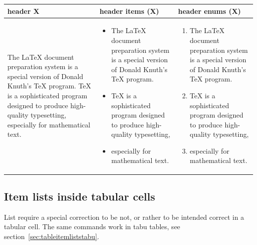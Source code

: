 \begin{filecontents*}{\democodefile}
\begin{center}
\small\centering\renewcommand{\arraystretch}{1.4}  
\begin{tabularx}{1\textwidth}{|X|X|X|}
\hline
   \centering header X &
   \centering header items (X) &   
   \centering header enums (X) \tabularnewline
\hline
%
The \LaTeX{} document preparation system is a special version of Donald
Knuth's \TeX{} program. \TeX{} is a sophisticated program designed to 
produce high-quality typesetting, especially for mathematical text.
&
\tableitemize
\begin{itemize}
\item The \LaTeX{} document preparation system is a special version of Donald
Knuth's \TeX{} program.
\item \TeX{} is a sophisticated program designed to produce high-quality typesetting,
\item especially for mathematical text.
\end{itemize}
&
\tableitemize
\begin{enumerate}
\item The \LaTeX{} document preparation system is a special version of Donald
Knuth's \TeX{} program.
\item \TeX{} is a sophisticated program designed to produce high-quality typesetting,
\item especially for mathematical text.
\end{enumerate}
\tabularnewline
\hline
\end{tabularx}
\end{center}
\end{filecontents*}

\subsection{Item lists inside tabular cells}
\label{sec:tableitemlists}
List require a special correction to be not, or rather to be intended correct in a tabular cell. The same commands work in tabu tables, see section~\ref{sec:tableitemliststabu}.

%

